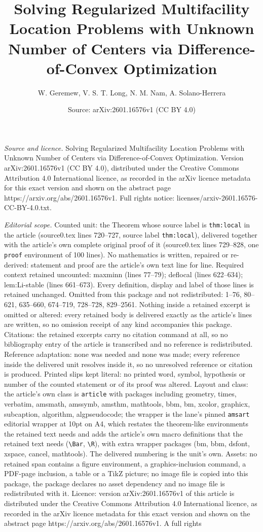 \documentclass[10pt,a4paper]{amsart}
\title[Solving Regularized Multifacility Location Problems with Unk]{Solving Regularized Multifacility Location Problems with Unknown Number of Centers via Difference-of-Convex Optimization}
\author{W. Geremew, V. S. T. Long, N. M. Nam, A. Solano-Herrera}
\date{Source: arXiv:2601.16576v1 (CC BY 4.0)}
\begin{document}
\maketitle

\noindent\emph{Source and licence.} Solving Regularized Multifacility Location Problems with Unknown Number of Centers via Difference-of-Convex Optimization. Version arXiv:2601.16576v1 (CC BY 4.0), distributed under the Creative Commons Attribution 4.0 International licence, as recorded in the arXiv licence metadata for this exact version and shown on the abstract page https://arxiv.org/abs/2601.16576v1. Full rights notice: licenses/arxiv-2601.16576-CC-BY-4.0.txt.\par\smallskip

\noindent\textit{Editorial scope.} Counted unit: the Theorem whose source label is \texttt{thm:local} in the article (source0.tex lines 720--727, source label \texttt{thm:local}), delivered together with the article's own complete original proof of it (source0.tex lines 729--828, one \texttt{proof} environment of 100 lines). No mathematics is written, repaired or re-derived: statement and proof are the article's own text line for line. Required context retained uncounted: maxminn (lines 77--79); deflocal (lines 622--634); lem:Li-stable (lines 661--673). Every definition, display and label of those lines is retained unchanged. Omitted from this package and not redistributed: 1--76, 80--621, 635--660, 674--719, 728--728, 829--2561. Nothing inside a retained excerpt is omitted or altered: every retained body is delivered exactly as the article's lines are written, so no omission receipt of any kind accompanies this package. Citations: the retained excerpts carry no citation command at all, so no bibliography entry of the article is transcribed and no reference is redistributed. Reference adaptation: none was needed and none was made; every reference inside the delivered unit resolves inside it, so no unresolved reference or citation is produced. Printed slips kept literal: no printed word, symbol, hypothesis or number of the counted statement or of its proof was altered. Layout and class: the article's own class is \texttt{article} with packages including geometry, times, verbatim, amsmath, amssymb, amsthm, mathtools, bbm, bm, xcolor, graphicx, subcaption, algorithm, algpseudocode; the wrapper is the lane's pinned \texttt{amsart} editorial wrapper at 10pt on A4, which restates the theorem-like environments the retained text needs and adds the article's own macro definitions that the retained text needs (\texttt{\textbackslash Bar}, \texttt{\textbackslash R}), with extra wrapper packages (bm, bbm, dsfont, xspace, cancel, mathtools). The delivered numbering is the unit's own. Assets: no retained span contains a figure environment, a graphics-inclusion command, a PDF-page inclusion, a table or a TikZ picture; no image file is copied into this package, the package declares no asset dependency and no image file is redistributed with it. Licence: version arXiv:2601.16576v1 of this article is distributed under the Creative Commons Attribution 4.0 International licence, as recorded in the arXiv licence metadata for this exact version and shown on the abstract page https://arxiv.org/abs/2601.16576v1. A full rights 
\end{document}

